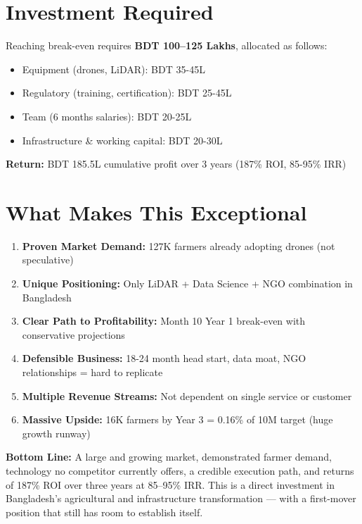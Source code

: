 \section*{Investment Required}

Reaching break-even requires \textbf{BDT 100--125 Lakhs}, allocated as follows:
\begin{itemize}
    \item Equipment (drones, LiDAR): BDT 35-45L
    \item Regulatory (training, certification): BDT 25-45L
    \item Team (6 months salaries): BDT 20-25L
    \item Infrastructure \& working capital: BDT 20-30L
\end{itemize}

\textbf{Return:} BDT 185.5L cumulative profit over 3 years (187\% ROI, 85-95\% IRR)

\section*{What Makes This Exceptional}

\begin{enumerate}
    \item \textbf{Proven Market Demand:} 127K farmers already adopting drones (not speculative)
    \item \textbf{Unique Positioning:} Only LiDAR + Data Science + NGO combination in Bangladesh
    \item \textbf{Clear Path to Profitability:} Month 10 Year 1 break-even with conservative projections
    \item \textbf{Defensible Business:} 18-24 month head start, data moat, NGO relationships = hard to replicate
    \item \textbf{Multiple Revenue Streams:} Not dependent on single service or customer
    \item \textbf{Massive Upside:} 16K farmers by Year 3 = 0.16\% of 10M target (huge growth runway)
\end{enumerate}

\textcolor{SecondaryBlue}{\textbf{Bottom Line:}} A large and growing market, demonstrated farmer demand, technology no competitor currently offers, a credible execution path, and returns of 187\% ROI over three years at 85--95\% IRR. This is a direct investment in Bangladesh's agricultural and infrastructure transformation --- with a first-mover position that still has room to establish itself.

